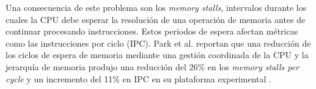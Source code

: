 Una consecuencia de este problema son los \textit{memory stalls}, intervalos
durante los cuales la CPU debe esperar la resolución de una operación de
memoria antes de continuar procesando instrucciones. Estos periodos de espera
afectan métricas como las instrucciones por ciclo (IPC). Park et al. reportan
que una reducción de los ciclos de espera de memoria mediante una gestión
coordinada de la CPU y la jerarquía de memoria produjo una reducción del
26\% en los \textit{memory stalls per cycle} y un incremento del 11\% en IPC
en su plataforma experimental \cite{park2022dvfs}.
